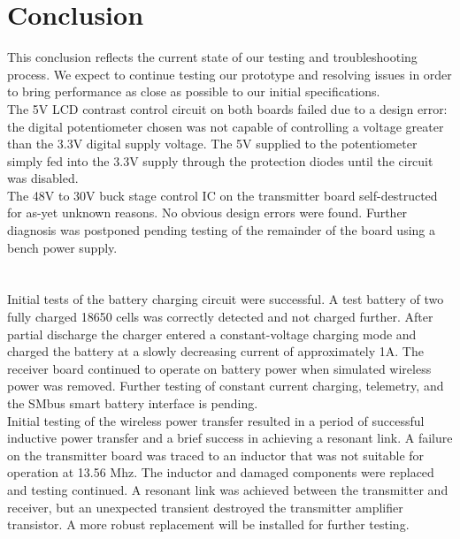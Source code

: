 \documentclass[12pt]{article}
\begin{document}
\section{Conclusion}

\indent
This conclusion reflects the current state of our testing and troubleshooting process. We expect to continue testing our prototype and resolving issues in order to bring performance as close as possible to our initial specifications.\\

\indent
The 5V LCD contrast control circuit on both boards failed due to a design error: the digital potentiometer chosen was not capable of controlling a voltage greater than the 3.3V digital supply voltage. The 5V supplied to the potentiometer simply fed into the 3.3V supply through the protection diodes until the circuit was disabled.\\

\indent
The 48V to 30V buck stage control IC on the transmitter board self-destructed for as-yet unknown reasons. No obvious design errors were found. Further diagnosis was postponed pending testing of the remainder of the board using a bench power supply.\\
\hfill \\
\pagebreak
\hfill \\

\indent
Initial tests of the battery charging circuit were successful. A test battery of two fully charged 18650 cells was correctly detected and not charged further. After partial discharge the charger entered a constant-voltage charging mode and charged the battery at a slowly decreasing current of approximately 1A. The receiver board continued to operate on battery power when simulated wireless power was removed. Further testing of constant current charging, telemetry, and the SMbus smart battery interface is pending.\\

\indent
Initial testing of the wireless power transfer resulted in a period of successful inductive power transfer and a brief success in achieving a resonant link. A failure on the transmitter board was traced to an inductor that was not suitable for operation at 13.56 Mhz. The inductor and damaged components were replaced and testing continued. A resonant link was achieved between the transmitter and receiver, but an unexpected transient destroyed the transmitter amplifier transistor. A more robust replacement will be installed for further testing.\\
\end{document}
